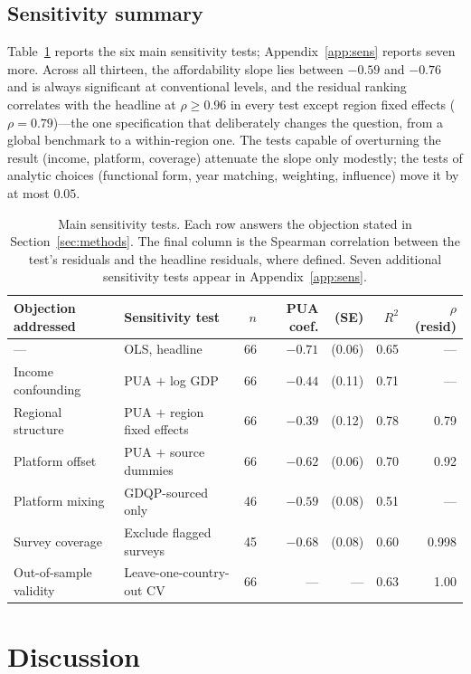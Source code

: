 \documentclass[11pt]{article}
\begin{document}
\subsection{Sensitivity summary}

Table~\ref{tab:robust} reports the six main sensitivity tests; Appendix~\ref{app:sens} reports seven more. Across all thirteen, the affordability slope lies between $-0.59$ and $-0.76$ and is always significant at conventional levels, and the residual ranking correlates with the headline at $\rho\geq0.96$ in every test except region fixed effects ($\rho=0.79$)---the one specification that deliberately changes the question, from a global benchmark to a within-region one. The tests capable of overturning the result (income, platform, coverage) attenuate the slope only modestly; the tests of analytic choices (functional form, year matching, weighting, influence) move it by at most $0.05$.

\begin{table}[tbp]
\centering\small
\caption{Main sensitivity tests. Each row answers the objection stated in Section~\ref{sec:methods}. The final column is the Spearman correlation between the test's residuals and the headline residuals, where defined. Seven additional sensitivity tests appear in Appendix~\ref{app:sens}.}
\label{tab:robust}
\begin{tabular}{llrrrrr}
\toprule
Objection addressed & Sensitivity test & $n$ & PUA coef. & (SE) & $R^2$ & $\rho$(resid)\\
\midrule
--- & OLS, headline & 66 & $-0.71$ & (0.06) & 0.65 & ---\\
Income confounding & PUA $+$ log GDP & 66 & $-0.44$ & (0.11) & 0.71 & ---\\
Regional structure & PUA $+$ region fixed effects & 66 & $-0.39$ & (0.12) & 0.78 & 0.79\\
Platform offset & PUA $+$ source dummies & 66 & $-0.62$ & (0.06) & 0.70 & 0.92\\
Platform mixing & GDQP-sourced only & 46 & $-0.59$ & (0.08) & 0.51 & ---\\
Survey coverage & Exclude flagged surveys & 45 & $-0.68$ & (0.08) & 0.60 & 0.998\\
Out-of-sample validity & Leave-one-country-out CV & 66 & --- & --- & 0.63 & 1.00\\
\bottomrule
\end{tabular}
\end{table}

\section{Discussion}\label{sec:discussion}
\end{document}
